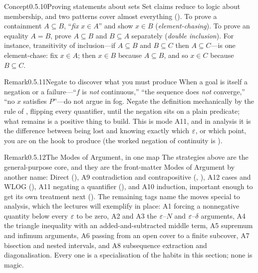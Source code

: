 \documentclass[main.tex]{subfiles}
\begin{document}
\begin{ObjL}{Concept}{0.5.10}{Proving statements about sets}
Set claims reduce to logic about membership, and two patterns cover almost everything
(). To prove a containment $A\subseteq B$, ``\emph{fix} $x\in A$'' and show $x\in B$
(\emph{element-chasing}). To prove an equality $A=B$, prove $A\subseteq B$ and $B\subseteq A$
separately (\emph{double inclusion}). For instance, transitivity of inclusion---if $A\subseteq B$ and
$B\subseteq C$ then $A\subseteq C$---is one element-chase: fix $x\in A$; then $x\in B$ because
$A\subseteq B$, and so $x\in C$ because $B\subseteq C$.
\end{ObjL}

\begin{ObjL}{Remark}{0.5.11}{Negate to discover what you must produce}
When a goal is itself a negation or a failure---``$f$ is \emph{not} continuous,'' ``the sequence does
\emph{not} converge,'' ``no $x$ satisfies $P$''---do not argue in fog. Negate the definition
mechanically by the rule of , flipping every quantifier, until the negation sits on a
plain predicate; what remains is a positive thing to build. This is mode \textsf{A11}, and in analysis
it is the difference between being lost and knowing exactly which $\varepsilon$, or which point, you are on
the hook to produce (the worked negation of continuity is ).
\end{ObjL}

\begin{ObjL}{Remark}{0.5.12}{The Modes of Argument, in one map}
The strategies above are the general-purpose core, and they are the front-matter Modes of Argument by
another name: \textsf{Direct} (), \textsf{A9} contradiction and contrapositive
(, ), \textsf{A12} cases and WLOG (), \textsf{A11} negating a
quantifier (), and \textsf{A10} induction, important enough to get its own treatment next
(). The remaining tags name the moves special to analysis, which the lectures will
exemplify in place: \textsf{A1} forcing a nonnegative quantity below every $\varepsilon$ to be zero,
\textsf{A2} and \textsf{A3} the $\varepsilon$--$N$ and $\varepsilon$--$\delta$ arguments, \textsf{A4} the triangle
inequality with an added-and-subtracted middle term, \textsf{A5} supremum and infimum arguments,
\textsf{A6} passing from an open cover to a finite subcover, \textsf{A7} bisection and nested
intervals, and \textsf{A8} subsequence extraction and diagonalisation. Every one is a specialisation
of the habits in this section; none is magic.
\end{ObjL}
\end{document}
